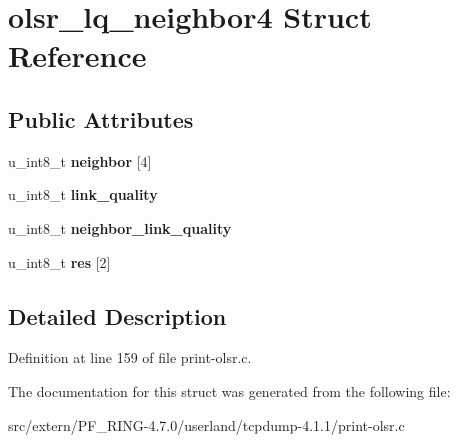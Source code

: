 \hypertarget{structolsr__lq__neighbor4}{
\section{olsr\_\-lq\_\-neighbor4 Struct Reference}
\label{structolsr__lq__neighbor4}
}
\subsection*{Public Attributes}
\begin{DoxyCompactItemize}
\item 
\hypertarget{structolsr__lq__neighbor4_a24b45b7a8cb8225cd815552c711ba10f}{
u\_\-int8\_\-t {\bfseries neighbor} \mbox{[}4\mbox{]}}
\label{structolsr__lq__neighbor4_a24b45b7a8cb8225cd815552c711ba10f}

\item 
\hypertarget{structolsr__lq__neighbor4_a46a455c83ffa3520280250064022c5ab}{
u\_\-int8\_\-t {\bfseries link\_\-quality}}
\label{structolsr__lq__neighbor4_a46a455c83ffa3520280250064022c5ab}

\item 
\hypertarget{structolsr__lq__neighbor4_a0fe139eff0d4e428ff2770e0f4a1c211}{
u\_\-int8\_\-t {\bfseries neighbor\_\-link\_\-quality}}
\label{structolsr__lq__neighbor4_a0fe139eff0d4e428ff2770e0f4a1c211}

\item 
\hypertarget{structolsr__lq__neighbor4_af75e59f9aa16a622a8751c97b9b5cf0a}{
u\_\-int8\_\-t {\bfseries res} \mbox{[}2\mbox{]}}
\label{structolsr__lq__neighbor4_af75e59f9aa16a622a8751c97b9b5cf0a}

\end{DoxyCompactItemize}


\subsection{Detailed Description}


Definition at line 159 of file print-\/olsr.c.



The documentation for this struct was generated from the following file:\begin{DoxyCompactItemize}
\item 
src/extern/PF\_\-RING-\/4.7.0/userland/tcpdump-\/4.1.1/print-\/olsr.c\end{DoxyCompactItemize}
